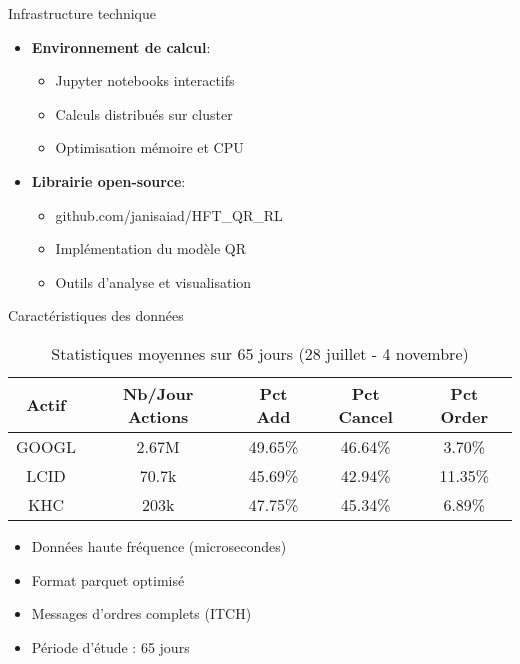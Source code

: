 \documentclass[aspectratio=169]{beamer}  %
\begin{document}
\begin{frame}{Infrastructure technique}
    \begin{itemize}
        \item \textbf{Environnement de calcul}:
        \begin{itemize}
            \item Jupyter notebooks interactifs
            \item Calculs distribués sur cluster
            \item Optimisation mémoire et CPU
        \end{itemize}
        \item \textbf{Librairie open-source}:
        \begin{itemize}
            \item github.com/janisaiad/HFT\_QR\_RL
            \item Implémentation du modèle QR
            \item Outils d'analyse et visualisation
        \end{itemize}
    \end{itemize}
\end{frame}

\begin{frame}{Caractéristiques des données}
    \begin{table}
    \centering
    \begin{tabular}{|c|c|c|c|c|}
    \hline
    \textbf{Actif} & \textbf{Nb/Jour Actions} & \textbf{Pct Add} & \textbf{Pct Cancel} & \textbf{Pct Order} \\ \hline
    GOOGL & 2.67M & 49.65\% & 46.64\% & 3.70\% \\ \hline
    LCID & 70.7k & 45.69\% & 42.94\% & 11.35\% \\ \hline
    KHC & 203k & 47.75\% & 45.34\% & 6.89\% \\ \hline
    \end{tabular}
    \caption{Statistiques moyennes sur 65 jours (28 juillet - 4 novembre)}
    \end{table}
    \vspace{0.3cm}
    \begin{itemize}
        \item Données haute fréquence (microsecondes)
        \item Format parquet optimisé
        \item Messages d'ordres complets (ITCH)
        \item Période d'étude : 65 jours
    \end{itemize}
\end{frame}
\end{document}
